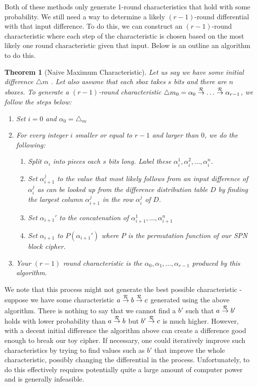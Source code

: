 \documentclass[12pt,a4paper]{article}
\newtheorem{theorem}{Theorem}
\newcommand{\differ}[1] {\overset{#1}{\rightarrow}}
\begin{document}
Both of these methods only generate 1-round characteristics that hold with some
probability. We still need a way to determine a likely $(r-1)$-round differential with
that input difference. To do this, we can construct an $(r-1)$-round
characteristic where each step of the characteristic is chosen based on the
most likely one round characteristic given that input. Below is an outline an
algorithm to do this. 

\begin{theorem}[Naive Maximum Characteristic]
\label{thm:naive_max}
Let us say we have some initial difference $\triangle m$ . Let also assume that
each sbox takes $s$ bits and there are $n$ sboxes. To generate a $(r-1)$-round
characteristic $\triangle m_0 = \alpha_0 \differ{{\cal{R}}} \ldots
\differ{{\cal{R}}} \alpha_{r-1}$, we follow the steps below:

\begin{enumerate}
    \item Set $i=0$ and $\alpha_0 = \triangle_m$
    \item For every integer $i$ smaller or equal to $r-1$ and larger than $0$,
    we do the following:
        \begin{enumerate}
            \item Split $\alpha_i$ into pieces each $s$ bits long. Label
            these $\alpha_i^1,\alpha_i^2,\ldots,\alpha_i^n$.
            \item Set $\alpha_{i+1}^j$ to the value that most likely follows
            from an input difference of $\alpha_i^j$ as can be looked up from
            the difference distribution table $D$ by finding the largest column
            $\alpha_{i+1}^j$ in the row $\alpha_i^j$ of $D$.
            \item Set $\alpha_{i+1}'$ to the concatenation of
            $\alpha_{i+1}^1,\ldots,\alpha_{i+1}^n$ 
            \item Set $\alpha_{i+1}$ to $P(\alpha_{i+1}')$ where $P$ is the
            permutation function of our SPN block cipher.
        \end{enumerate}
    \item Your $(r-1)$ round characteristic is the
    $\alpha_0,\alpha_1,\ldots,\alpha_{r-1}$ produced by this algorithm.
\end{enumerate}
\end{theorem}

We note that this process might not generate the best possible characteristic -
suppose we have some characteristic $a \differ{\cal{R}} b \differ{\cal{R}} c$
generated using the above algorithm. There is nothing to say that we cannot find
a $b'$ such that $a \differ{\cal{R}} b'$ holds with lower probability than $a
\differ{\cal{R}} b$ but $b' \differ{\cal{R}} c$ is much higher. However, with a
decent initial difference the algorithm above can create a difference good
enough to break our toy cipher. If necessary, one could iteratively improve
such characteristics by trying to find values such as $b'$ that improve the
whole characteristic, possibly changing the differential in the process.
Unfortunately, to do this effectively requires potentially quite a large amount
of computer power and is generally infeasible.
\end{document}
